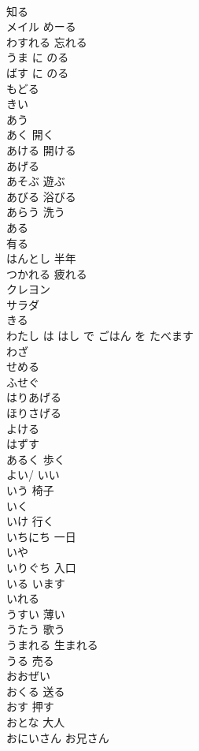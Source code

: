\documentclass[8pt]{extreport}
\begin{document}
\begin{CJK}{UTF8}{min}
\\	知る
\\	メイル	めーる
\\	わすれる	忘れる
\\	うま に のる	
\\	ばす に のる	
\\	もどる	
\\	きい	
\\	あう	
\\	あく	開く
\\	あける	開ける
\\	あげる	
\\	あそぶ	遊ぶ
\\	あびる	浴びる
\\	あらう	洗う
\\	ある	
\\	有る
\\	はんとし	半年
\\	つかれる	疲れる
\\	クレヨン	
\\	サラダ	
\\	きる	
\\	わたし は はし で ごはん を たべます	
\\	わざ	
\\	せめる	
\\	ふせぐ	
\\	はりあげる	
\\	ほりさげる	
\\	よける	
\\	はずす	
\\	あるく	歩く
\\	よい/ いい	
\\	いう	椅子
\\	いく	
\\	いけ	行く
\\	いちにち	一日
\\	いや	
\\	いりぐち	入口
\\	いる	います 
\\	いれる	
\\	うすい	薄い
\\	うたう	歌う
\\	うまれる	生まれる
\\	うる	売る
\\	おおぜい	
\\	おくる	送る
\\	おす	押す
\\	おとな	大人
\\	おにいさん	お兄さん

\end{CJK}
\end{document}
